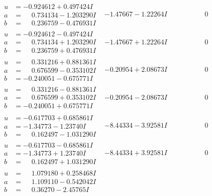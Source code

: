 \documentclass[1p]{elsarticle_modified}
\theoremstyle{definition}
\begin{document}
$$\begin{array}{c|c|c}
\begin{aligned}
u &= -0.924612 + 0.497424 I \\
a &= \phantom{-}0.734134 - 1.203290 I \\
b &= \phantom{-}0.236759 - 0.476931 I\end{aligned}
 & -1.47667 - 1.22264 I & \phantom{-0.000000 } 0 \\ \hline\begin{aligned}
u &= -0.924612 - 0.497424 I \\
a &= \phantom{-}0.734134 + 1.203290 I \\
b &= \phantom{-}0.236759 + 0.476931 I\end{aligned}
 & -1.47667 + 1.22264 I & \phantom{-0.000000 } 0 \\ \hline\begin{aligned}
u &= \phantom{-}0.331216 + 0.881361 I \\
a &= \phantom{-}0.676599 - 0.353102 I \\
b &= -0.240051 - 0.675771 I\end{aligned}
 & -0.20954 + 2.08673 I & \phantom{-0.000000 } 0 \\ \hline\begin{aligned}
u &= \phantom{-}0.331216 - 0.881361 I \\
a &= \phantom{-}0.676599 + 0.353102 I \\
b &= -0.240051 + 0.675771 I\end{aligned}
 & -0.20954 - 2.08673 I & \phantom{-0.000000 } 0 \\ \hline\begin{aligned}
u &= -0.617703 + 0.685861 I \\
a &= -1.34773 - 1.23740 I \\
b &= \phantom{-}0.162497 - 1.031290 I\end{aligned}
 & -8.44334 - 3.92581 I & \phantom{-0.000000 } 0 \\ \hline\begin{aligned}
u &= -0.617703 - 0.685861 I \\
a &= -1.34773 + 1.23740 I \\
b &= \phantom{-}0.162497 + 1.031290 I\end{aligned}
 & -8.44334 + 3.92581 I & \phantom{-0.000000 } 0 \\ \hline\begin{aligned}
u &= \phantom{-}1.079180 + 0.258468 I \\
a &= \phantom{-}1.109110 - 0.542042 I \\
b &= \phantom{-}0.36270 - 2.45765 I\end{aligned}

\end{array}$$
\end{document}
